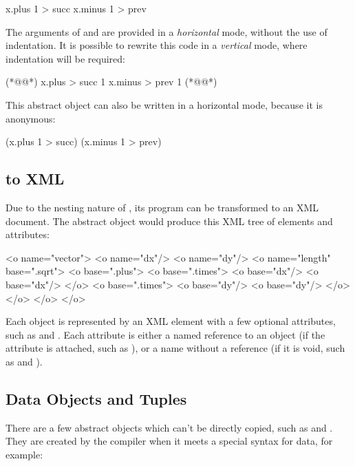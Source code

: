 \begin{ffcode}
[x]
  x.plus 1 > succ
  x.minus 1 > prev
\end{ffcode}

The arguments of  and  are provided in a \emph{horizontal}
mode, without the use of indentation. It is possible to rewrite this code
in a \emph{vertical} mode, where indentation will be required:

\begin{ffcode}
[x] (*@\label{ln:succ}@*)
  x.plus > succ
    1
  x.minus > prev
    1 (*@\label{ln:succ-end}@*)
\end{ffcode}

This abstract object can also be written in a horizontal mode,
because it is anonymous:

\begin{ffcode}
[x] (x.plus 1 > succ) (x.minus 1 > prev)
\end{ffcode}

\subsection{\eolang{} to XML}\label{sec:xml}

Due to the nesting nature of \eolang{}, its program can be transformed
to an XML document. The abstract object  would produce
this XML tree of elements and attributes:

\begin{ffcode}
<o name="vector">
  <o name="dx"/>
  <o name="dy"/>
  <o name="length" base=".sqrt">
    <o base=".plus">
      <o base=".times">
        <o base="dx"/>
        <o base="dx"/>
      </o>
      <o base=".times">
        <o base="dy"/>
        <o base="dy"/>
      </o>
    </o>
  </o>
</o>
\end{ffcode}

Each object is represented by an  XML element with a few
optional attributes, such as  and . Each
attribute is either a named reference to an object (if the attribute is attached,
such as ), or a name without a reference (if it is void,
such as  and ).

\subsection{Data Objects and Tuples}

There are a few abstract objects which can't be directly copied, such as
 and . They are created by the compiler when it meets
a special syntax for data, for example:

